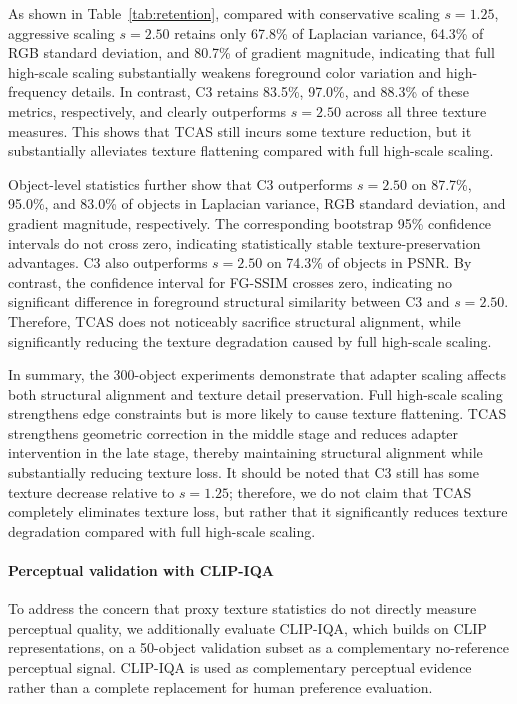 \documentclass[times,twocolumn,final]{elsarticle}
\providecommand{\DIFadd}[1]{{\protect\color{red} \sf #1}} %
\providecommand{\DIFaddbegin}{} %
\newcommand{\DIFaddincludegraphics}[2][]{{\color{red}\fbox{\DIFOincludegraphics[#1]{#2}}}} %
\DeclareRobustCommand{\DIFaddbegin}{\DIFOaddbegin \let\includegraphics\DIFaddincludegraphics} %
\begin{document}
As shown in Table~\ref{tab:retention}, compared with conservative scaling $s = 1.25$, aggressive scaling $s = 2.50$ retains only 67.8\% of Laplacian variance, 64.3\% of RGB standard deviation, and 80.7\% of gradient magnitude, indicating that full high-scale scaling substantially weakens foreground color variation and high-frequency details. In contrast, C3 retains 83.5\%, 97.0\%, and 88.3\% of these metrics, respectively, and clearly outperforms $s = 2.50$ across all three texture measures. This shows that TCAS still incurs some texture reduction, but it substantially alleviates texture flattening compared with full high-scale scaling.

Object-level statistics further show that C3 outperforms $s = 2.50$ on 87.7\%, 95.0\%, and 83.0\% of objects in Laplacian variance, RGB standard deviation, and gradient magnitude, respectively. The corresponding bootstrap 95\% confidence intervals do not cross zero, indicating statistically stable texture-preservation advantages. C3 also outperforms $s = 2.50$ on 74.3\% of objects in PSNR. By contrast, the confidence interval for FG-SSIM crosses zero, indicating no significant difference in foreground structural similarity between C3 and $s = 2.50$. Therefore, TCAS does not noticeably sacrifice structural alignment, while significantly reducing the texture degradation caused by full high-scale scaling.

In summary, the 300-object experiments demonstrate that adapter scaling affects both structural alignment and texture detail preservation. Full high-scale scaling strengthens edge constraints but is more likely to cause texture flattening. TCAS strengthens geometric correction in the middle stage and reduces adapter intervention in the late stage, thereby maintaining structural alignment while substantially reducing texture loss. It should be noted that C3 still has some texture decrease relative to $s = 1.25$; therefore, we do not claim that TCAS completely eliminates texture loss, but rather that it significantly reduces texture degradation compared with full high-scale scaling.

\DIFaddbegin \paragraph{\DIFadd{Perceptual validation with CLIP-IQA}}
\DIFadd{To address the concern that proxy texture statistics do not directly measure perceptual quality, we additionally evaluate CLIP-IQA, which builds on CLIP representations, on a 50-object validation subset as a complementary no-reference perceptual signal. CLIP-IQA is used as complementary perceptual evidence rather than a complete replacement for human preference evaluation.
}
\end{document}
